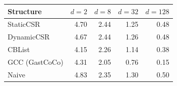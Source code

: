 \begin{tabular}{lrrrr}
\toprule
Structure & $d{=}2$ & $d{=}8$ & $d{=}32$ & $d{=}128$ \\
\midrule
StaticCSR & 4.70 & 2.44 & 1.25 & 0.48 \\
DynamicCSR & 4.67 & 2.44 & 1.26 & 0.48 \\
CBList & 4.15 & 2.26 & 1.14 & 0.38 \\
GCC (GastCoCo) & 4.31 & 2.05 & 0.76 & 0.15 \\
Naive & 4.83 & 2.35 & 1.30 & 0.50 \\
\bottomrule
\end{tabular}